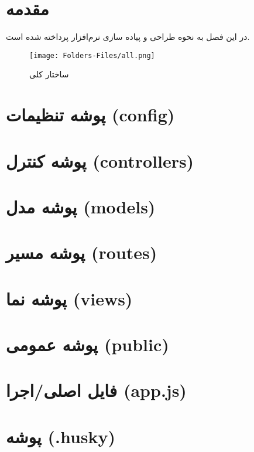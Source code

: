 


\section*{مقدمه}
در این فصل به نحوه طراحی و پیاده سازی نرم‌افزار پرداخته شده است.
\begin{figure}[H]
	\texttt{[image: Folders-Files/all.png]}
	\centering
	\caption{ساختار کلی}
	\label{fig:folder-main}
\end{figure}

\section{پوشه تنظیمات (config)}


\section{پوشه کنترل (controllers)}


\section{پوشه مدل (models)}


\section{پوشه مسیر (routes)}


\section{پوشه نما (views)}


\section{پوشه عمومی‌ (public)}


\section{فایل اصلی/اجرا (app.js)}


\section{پوشه  (.husky)}


